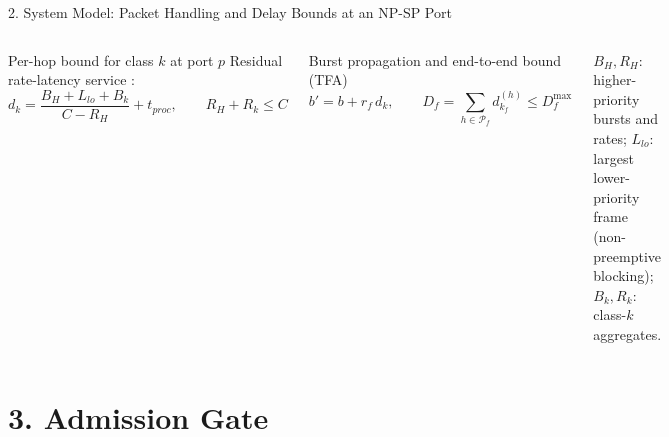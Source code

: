 \documentclass[xcolor=x11names,t,aspectratio=169]{beamer}
\begin{document}
\begin{frame}{2. System Model: Packet Handling and Delay Bounds at an NP-SP Port}
\begin{columns}[T,totalwidth=\textwidth]
\begin{block}{Per-hop bound for class $k$ at port $p$}
{\footnotesize Residual rate-latency service \cite{leboudec2001nc,bouillard2018dnc}:}
\vspace{-0.2cm}
\[
d_k=\frac{B_H+L_{lo}+B_k}{C-R_H}+t_{proc},\qquad R_H+R_k\le C
\]
\vspace{-0.4cm}
\end{block}
\begin{block}{Burst propagation and end-to-end bound (TFA)}
\vspace{-0.2cm}
\[
b'=b+r_f\,d_k,\qquad D_f=\sum_{h\in\mathcal{P}_f} d_{k_f}^{(h)}\le D^{\max}_f
\]
\vspace{-0.4cm}
\end{block}
{\footnotesize $B_H,R_H$: higher-priority bursts and rates; $L_{lo}$: largest lower-priority frame (non-preemptive blocking); $B_k,R_k$: class-$k$ aggregates.}
\end{columns}
\end{frame}

\section{3. Admission Gate}
\end{document}
